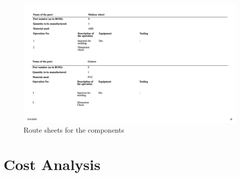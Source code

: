 \documentclass[12pt]{article}
\begin{document}
\begin{appendices}
\begin{figure}[H]
    \centering
    \includegraphics[width=\textwidth]{Slide12.jpeg} 
    \caption{Route sheets for the components}
    \label{fig:route-sheet}
\end{figure}

\section{Cost Analysis}


\end{appendices}
\end{document}
